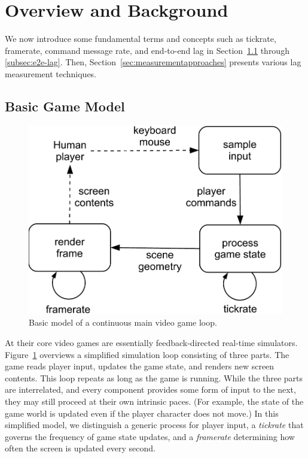 \section{Overview and Background}
\label{sec:background}

We now introduce some fundamental terms and concepts such as tickrate, 
framerate, command message rate, and end-to-end lag 
in Section~\ref{subsec:game-model} through 
\ref{subsec:e2e-lag}. Then, Section~\ref{sec:measurementapproaches} 
presents various lag measurement techniques.


\subsection{Basic Game Model}
\label{subsec:game-model}

\begin{figure}[!t]
\centering
\includegraphics[width=0.9\columnwidth]{../models/game_loop.pdf}
\caption{Basic model of a continuous main video game loop.}
\label{fig:gameloop1}
\end{figure}

At their core video games are essentially feedback-directed 
real-time simulators. Figure~\ref{fig:gameloop1} overviews a 
simplified simulation loop consisting of three parts.
The game reads player input, updates the game state, and renders 
new screen contents. This loop repeats as long as the game is running. 
While the three parts are interrelated, and every component provides 
some form of input to the next, they may still proceed at their own 
intrinsic paces. (For example, the state of the game world is updated 
even if the player character does not move.)
In this simplified model, we distinguish a generic process for player 
input, a \textit{tickrate} that governs the frequency of game state updates, and 
a \textit{framerate} determining how often the screen is updated every second.

